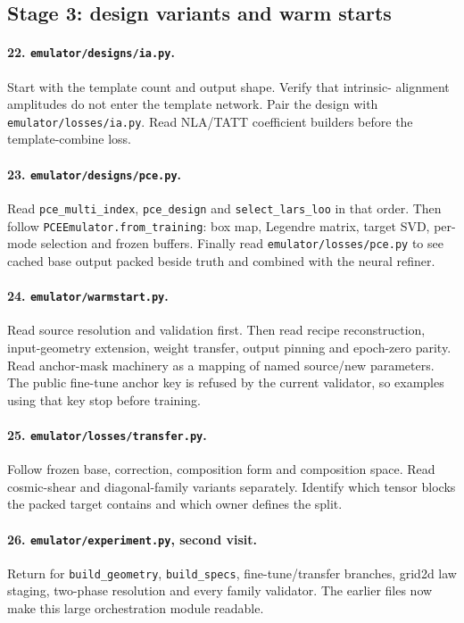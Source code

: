 \documentclass[10pt,aps,prd,twocolumn,nofootinbib]{revtex4-2}
\newcommand{\code}[1]{\texttt{#1}}
\begin{document}
\subsection{Stage 3: design variants and warm starts}

\paragraph{22.  \code{emulator/designs/ia.py}.}
Start with the template count and output shape.  Verify that intrinsic-
alignment amplitudes do not enter the template network.  Pair the design with
\code{emulator/losses/ia.py}.  Read NLA/TATT coefficient builders before the
template-combine loss.

\paragraph{23.  \code{emulator/designs/pce.py}.}
Read \code{pce\_multi\_index}, \code{pce\_design} and
\code{select\_lars\_loo} in that order.  Then follow
\code{PCEEmulator.from\_training}: box map, Legendre matrix, target SVD,
per-mode selection and frozen buffers.  Finally read
\code{emulator/losses/pce.py} to see cached base output packed beside truth and
combined with the neural refiner.

\paragraph{24.  \code{emulator/warmstart.py}.}
Read source resolution and validation first.  Then read recipe reconstruction,
input-geometry extension, weight transfer, output pinning and epoch-zero
parity.  Read anchor-mask machinery as a mapping of named source/new
parameters.  The public fine-tune anchor key is refused by the current
validator, so examples using that key stop before training.

\paragraph{25.  \code{emulator/losses/transfer.py}.}
Follow frozen base, correction, composition form and composition space.  Read
cosmic-shear and diagonal-family variants separately.  Identify which tensor
blocks the packed target contains and which owner defines the split.

\paragraph{26.  \code{emulator/experiment.py}, second visit.}
Return for \code{build\_geometry}, \code{build\_specs}, fine-tune/transfer
branches, grid2d law staging, two-phase resolution and every family validator.
The earlier files now make this large orchestration module readable.
\end{document}
